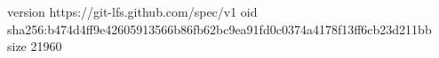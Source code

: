 version https://git-lfs.github.com/spec/v1
oid sha256:b474d4ff9e42605913566b86fb62bc9ea91fd0c0374a4178f13ff6cb23d211bb
size 21960
